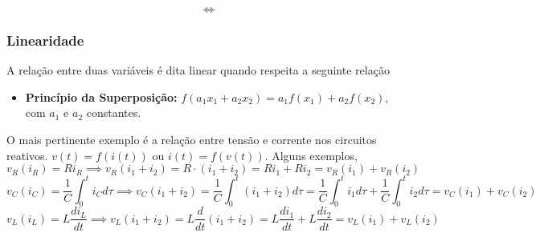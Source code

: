 \documentclass{article}
\numberwithin{equation}{section}
\newlength\Colsep
\begin{document}
\noindent\begin{minipage}{\textwidth}
\begin{minipage}[c][5cm][c]{\dimexpr0.45\textwidth-0.5\Colsep\relax}
    \begin{center}
    \end{center}
\end{minipage} \hfill
\begin{minipage}[c][5cm][c]{\dimexpr0.1\textwidth-0.5\Colsep\relax}
    $$\iff$$
\end{minipage} \hfill
\begin{minipage}[c][5cm][c]{\dimexpr0.45\textwidth-0.5\Colsep\relax}
    \begin{center}
    \end{center}
\end{minipage}
\end{minipage}


\subsubsection{Linearidade}
A relação entre duas variáveis é dita linear quando respeita a seguinte relação
\begin{itemize}
    \item \textbf{Princípio da Superposição:} $f(a_1 x_{1}+a_2 x_{2})= a_1f(x_{1})+a_2f(x_{2})$, com $a_1$ e $a_2$ constantes.
\end{itemize}
O mais pertinente exemplo é a relação entre tensão e corrente nos circuitos reativos. $v(t)=f(i(t))$ ou $i(t)=f(v(t))$. Alguns exemplos,
    $$v_R(i_R)=Ri_R \implies v_R(i_1+i_2) = R\cdot(i_1+i_2) = Ri_1+Ri_2 = v_R(i_1) + v_R(i_2)$$
    $$v_C(i_C)=\frac{1}{C}\int_0^ti_Cd\tau \implies v_C(i_1+i_2)=\frac{1}{C}\int_0^t(i_1+i_2)d\tau=\frac{1}{C}\int_0^ti_1d\tau+\frac{1}{C}\int_0^ti_2d\tau=v_C(i_1)+v_C(i_2)$$
    $$v_L(i_L)=L\frac{di_L}{dt} \implies v_L(i_1+i_2)=L\frac{d}{dt}(i_1+i_2)=L\frac{di_1}{dt}+L\frac{di_2}{dt}=v_L(i_1)+v_L(i_2)$$
\end{document}

